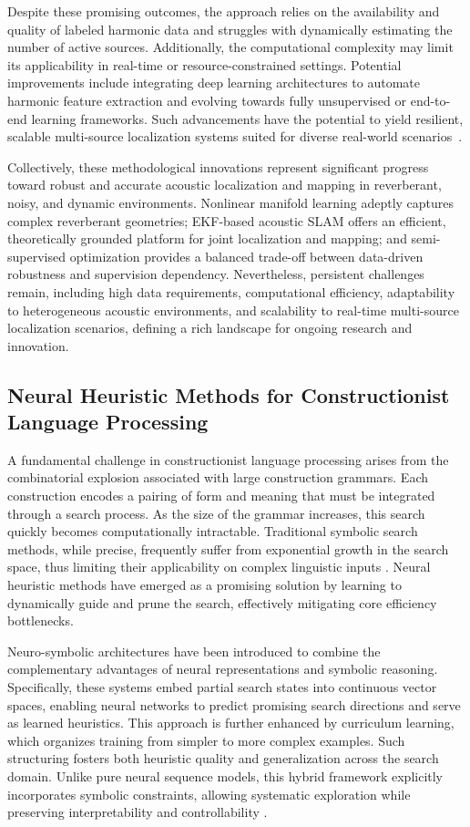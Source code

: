 \documentclass[sigconf]{acmart}
\begin{document}
Despite these promising outcomes, the approach relies on the availability and quality of labeled harmonic data and struggles with dynamically estimating the number of active sources. Additionally, the computational complexity may limit its applicability in real-time or resource-constrained settings. Potential improvements include integrating deep learning architectures to automate harmonic feature extraction and evolving towards fully unsupervised or end-to-end learning frameworks. Such advancements have the potential to yield resilient, scalable multi-source localization systems suited for diverse real-world scenarios~\cite{ref52}.

Collectively, these methodological innovations represent significant progress toward robust and accurate acoustic localization and mapping in reverberant, noisy, and dynamic environments. Nonlinear manifold learning adeptly captures complex reverberant geometries; EKF-based acoustic SLAM offers an efficient, theoretically grounded platform for joint localization and mapping; and semi-supervised optimization provides a balanced trade-off between data-driven robustness and supervision dependency. Nevertheless, persistent challenges remain, including high data requirements, computational efficiency, adaptability to heterogeneous acoustic environments, and scalability to real-time multi-source localization scenarios, defining a rich landscape for ongoing research and innovation.

\subsection{Neural Heuristic Methods for Constructionist Language Processing}

A fundamental challenge in constructionist language processing arises from the combinatorial explosion associated with large construction grammars. Each construction encodes a pairing of form and meaning that must be integrated through a search process. As the size of the grammar increases, this search quickly becomes computationally intractable. Traditional symbolic search methods, while precise, frequently suffer from exponential growth in the search space, thus limiting their applicability on complex linguistic inputs \cite{ref40}. Neural heuristic methods have emerged as a promising solution by learning to dynamically guide and prune the search, effectively mitigating core efficiency bottlenecks.

Neuro-symbolic architectures have been introduced to combine the complementary advantages of neural representations and symbolic reasoning. Specifically, these systems embed partial search states into continuous vector spaces, enabling neural networks to predict promising search directions and serve as learned heuristics. This approach is further enhanced by curriculum learning, which organizes training from simpler to more complex examples. Such structuring fosters both heuristic quality and generalization across the search domain. Unlike pure neural sequence models, this hybrid framework explicitly incorporates symbolic constraints, allowing systematic exploration while preserving interpretability and controllability \cite{ref40}.
\end{document}
